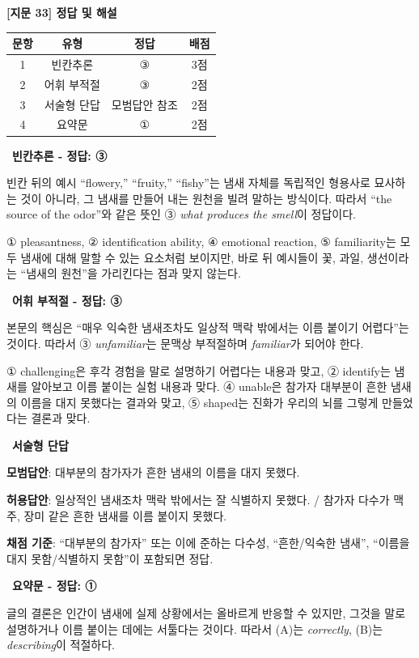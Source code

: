 \documentclass[11pt,a4paper]{article}
\newcommand{\qno}[1]{\par\vspace{10pt}{\sffamily\bfseries #1.}\ }
\begin{document}
\begin{center}
{\fontsize{15}{17}\selectfont\sffamily\bfseries [지문 33] 정답 및 해설}
\end{center}
\vspace{6pt}
\begin{center}
\renewcommand{\arraystretch}{1.35}
\begin{tabular}{cccc}
\toprule
문항 & 유형 & 정답 & 배점 \\
\midrule
1 & 빈칸추론 & ③ & 3점 \\
2 & 어휘 부적절 & ③ & 2점 \\
3 & 서술형 단답 & 모범답안 참조 & 2점 \\
4 & 요약문 & ① & 2점 \\
\bottomrule
\end{tabular}
\end{center}

\qno{1}\textbf{빈칸추론 - 정답: ③}
\begin{pbox}
빈칸 뒤의 예시 ``flowery,'' ``fruity,'' ``fishy''는 냄새 자체를 독립적인 형용사로 묘사하는 것이 아니라, 그 냄새를 만들어 내는 원천을 빌려 말하는 방식이다. 따라서 ``the source of the odor''와 같은 뜻인 ③ \textit{what produces the smell}이 정답이다.

\medskip
① pleasantness, ② identification ability, ④ emotional reaction, ⑤ familiarity는 모두 냄새에 대해 말할 수 있는 요소처럼 보이지만, 바로 뒤 예시들이 꽃, 과일, 생선이라는 ``냄새의 원천''을 가리킨다는 점과 맞지 않는다.
\end{pbox}

\qno{2}\textbf{어휘 부적절 - 정답: ③}
\begin{pbox}
본문의 핵심은 ``매우 익숙한 냄새조차도 일상적 맥락 밖에서는 이름 붙이기 어렵다''는 것이다. 따라서 ③ \textit{unfamiliar}는 문맥상 부적절하며 \textit{familiar}가 되어야 한다.

\medskip
① challenging은 후각 경험을 말로 설명하기 어렵다는 내용과 맞고, ② identify는 냄새를 알아보고 이름 붙이는 실험 내용과 맞다. ④ unable은 참가자 대부분이 흔한 냄새의 이름을 대지 못했다는 결과와 맞고, ⑤ shaped는 진화가 우리의 뇌를 그렇게 만들었다는 결론과 맞다.
\end{pbox}

\qno{3}\textbf{서술형 단답}
\begin{pbox}
\textbf{모범답안}: 대부분의 참가자가 흔한 냄새의 이름을 대지 못했다.

\medskip
\textbf{허용답안}: 일상적인 냄새조차 맥락 밖에서는 잘 식별하지 못했다. / 참가자 다수가 맥주, 장미 같은 흔한 냄새를 이름 붙이지 못했다.

\medskip
\textbf{채점 기준}: ``대부분의 참가자'' 또는 이에 준하는 다수성, ``흔한/익숙한 냄새'', ``이름을 대지 못함/식별하지 못함''이 포함되면 정답.
\end{pbox}
\vspace{8pt}
\qno{4}\textbf{요약문 - 정답: ①}
\begin{pbox}
글의 결론은 인간이 냄새에 실제 상황에서는 올바르게 반응할 수 있지만, 그것을 말로 설명하거나 이름 붙이는 데에는 서툴다는 것이다. 따라서 (A)는 \textit{correctly}, (B)는 \textit{describing}이 적절하다.
\end{pbox}
\end{document}
